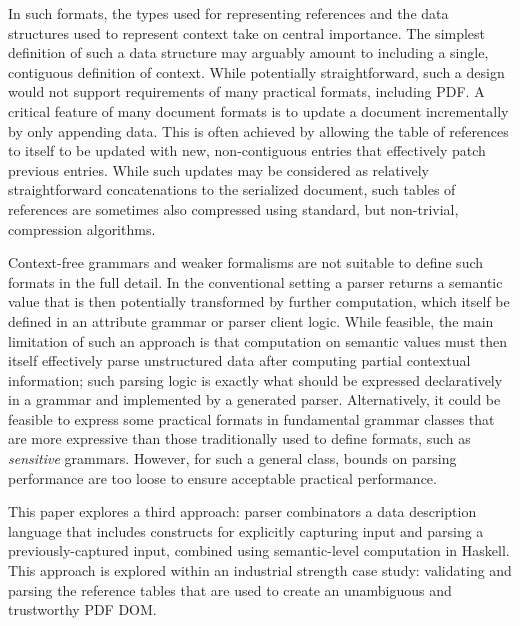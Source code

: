 In such formats, the types used for representing references and the
data structures used to represent context take on central importance.
%
The simplest definition of such a data structure may arguably amount
to including a single, contiguous definition of context.
%
While potentially straightforward, such a design would not support
requirements of many practical formats, including PDF.
%
A critical feature of many document formats is to update a
document incrementally by only appending data. This is often achieved
by allowing the table of references to itself to be updated with new,
non-contiguous entries that effectively patch previous entries.
%
While such updates may be considered as relatively straightforward concatenations to 
the serialized document, such tables of references are sometimes also compressed 
using standard, but non-trivial, compression algorithms.

Context-free grammars and weaker formalisms are not suitable to define
such formats in the full detail.
%
In the conventional setting a parser returns a semantic value
that is then potentially transformed by further computation, which 
itself be defined in an attribute grammar or parser client logic.
%
While feasible, the main limitation of such an approach is that
computation on semantic values must then itself effectively parse
unstructured data after computing partial contextual information;
%
such parsing logic is exactly what should be expressed declaratively
in a grammar and implemented by a generated parser.
%
Alternatively, it could be feasible to express some
practical formats in fundamental grammar classes that are more
expressive than those traditionally used to define formats, such as
\emph{sensitive} grammars.
%
However, for such a general class, bounds on parsing performance are
too loose to ensure acceptable practical performance.

This paper explores a third approach: parser combinators a data
description language that includes constructs for explicitly capturing
input and parsing a previously-captured input, combined using
semantic-level computation in Haskell.
%
This approach is explored within an industrial strength case study:
validating and parsing the reference tables that are used to create 
an unambiguous and trustworthy PDF DOM.


